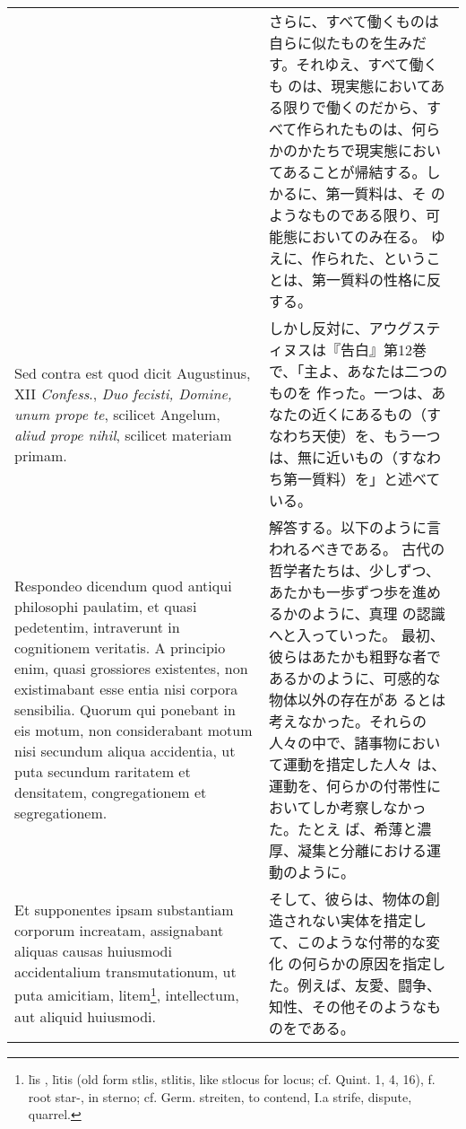 \documentclass[10pt]{jsarticle} %
\begin{document}
\begin{longtable}{p{21em}p{21em}}
&

さらに、すべて働くものは自らに似たものを生みだす。それゆえ、すべて働くも
 のは、現実態においてある限りで働くのだから、すべて作られたものは、何ら
 かのかたちで現実態においてあることが帰結する。しかるに、第一質料は、そ
 のようなものである限り、可能態においてのみ在る。
 ゆえに、作られた、ということは、第一質料の性格に反する。

\\

{\sc Sed contra est} quod dicit Augustinus, XII {\it Confess}., {\it Duo fecisti,
 Domine, unum prope te}, scilicet Angelum, {\it aliud prope nihil}, scilicet
 materiam primam.

&
しかし反対に、アウグスティヌスは『告白』第12巻で、「主よ、あなたは二つのものを
 作った。一つは、あなたの近くにあるもの（すなわち天使）を、もう一つ
 は、無に近いもの（すなわち第一質料）を」と述べている。

\\

Respondeo dicendum quod antiqui philosophi paulatim, et quasi
 pedetentim, intraverunt in cognitionem veritatis. A principio enim,
 quasi grossiores existentes, non existimabant esse entia nisi corpora
 sensibilia. Quorum qui ponebant in eis motum, non considerabant motum
 nisi secundum aliqua accidentia, ut puta secundum raritatem et
 densitatem, congregationem et segregationem. 

&

解答する。以下のように言われるべきである。
古代の哲学者たちは、少しずつ、あたかも一歩ずつ歩を進めるかのように、真理
の認識へと入っていった。
最初、彼らはあたかも粗野な者であるかのように、可感的な物体以外の存在があ
るとは考えなかった。それらの人々の中で、諸事物において運動を措定した人々
 は、運動を、何らかの付帯性においてしか考察しなかった。たとえ ば、希薄と濃
 厚、凝集と分離における運動のように。


\\

Et supponentes ipsam
 substantiam corporum increatam, assignabant aliquas causas huiusmodi
 accidentalium transmutationum, ut puta amicitiam, litem\footnote
{
l\={\i}s , l\={\i}tis (old form stlis, stlitis, like stlocus for locus; cf. Quint. 1, 4, 16), f. root star-, in sterno; cf. Germ. streiten, to contend,
I.a strife, dispute, quarrel. 
}, intellectum,
 aut aliquid huiusmodi. 

&

そして、彼らは、物体の創造されない実体を措定して、このような付帯的な変化
 の何らかの原因を指定した。例えば、友愛、闘争、知性、その他そのようなも
 のをである。



\end{longtable}
\end{document}
